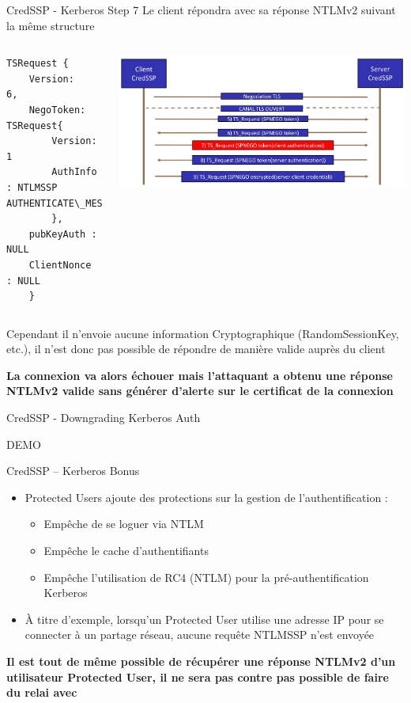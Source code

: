 \documentclass{beamer}
\begin{document}
\begin{frame}[fragile]{CredSSP - Kerberos Step 7}
Le client répondra avec sa réponse NTLMv2 suivant la même structure
\begin{columns}[T]
\begin{lstlisting}[frame=single,basicstyle=\tiny]
TSRequest {
	Version:     6,
	NegoToken: TSRequest{
		Version: 1
		AuthInfo : NTLMSSP AUTHENTICATE\_MESSAGE
		},
	pubKeyAuth : NULL
	ClientNonce : NULL
	}
	\end{lstlisting}
 \includegraphics[scale=0.07]{step7.jpg}
\end{columns}
Cependant il n'envoie aucune information Cryptographique (RandomSessionKey, etc.), il n'est donc pas possible de répondre de manière valide auprès du client

\textbf{La connexion va alors échouer mais l'attaquant a obtenu une réponse NTLMv2 valide sans générer d'alerte sur le certificat de la connexion}
\end{frame}

\begin{frame}[fragile]{CredSSP - Downgrading Kerberos Auth}
	 \begin{center} DEMO
	 \end{center}
\end{frame}


\begin{frame}[fragile]{CredSSP -- Kerberos Bonus}
\begin{itemize}
\item Protected Users ajoute des protections sur la gestion de l'authentification :
	\begin{itemize}
	\item Empêche de se loguer via NTLM
	\item Empêche le cache d'authentifiants
	\item Empêche l'utilisation de RC4 (NTLM) pour la pré-authentification Kerberos
	\end{itemize}
	\item À titre d'exemple, lorsqu'un Protected User utilise une adresse IP pour se connecter à un partage réseau, aucune requête NTLMSSP n'est envoyée
\end{itemize}
\textbf{Il est tout de même possible de récupérer une réponse NTLMv2 d'un utilisateur Protected User, il ne sera pas contre pas possible de faire du relai avec}
\end{frame}
\end{document}
